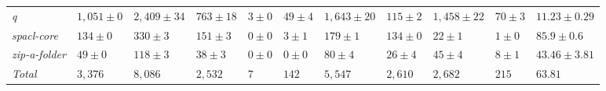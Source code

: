 \begin{table}
{\begin{tabular}[t]{lllllllllll}
\textit{q} & $1,051 \pm 0$ & $2,409 \pm 34$ & $763 \pm 18$ & $3 \pm 0$ & $49 \pm 4$ & $1,643 \pm 20$ & $115 \pm 2$ & $1,458 \pm 22$ & $70 \pm 3$ & $11.23 \pm 0.29$\\
\textit{spacl-core} & $134 \pm 0$ & $330 \pm 3$ & $151 \pm 3$ & $0 \pm 0$ & $3 \pm 1$ & $179 \pm 1$ & $134 \pm 0$ & $22 \pm 1$ & $1 \pm 0$ & $85.9 \pm 0.6$\\
\textit{zip-a-folder} & $49 \pm 0$ & $118 \pm 3$ & $38 \pm 3$ & $0 \pm 0$ & $0 \pm 0$ & $80 \pm 4$ & $26 \pm 4$ & $45 \pm 4$ & $8 \pm 1$ & $43.46 \pm 3.81$\\
\hline\textit{Total} & $3,376$ & $8,086$ & $2,532$ & $7$ & $142$ & $5,547$ & $2,610$ & $2,682$ & $215$ & $63.81$\\
\bottomrule
\end{tabular}}
\end{table}
